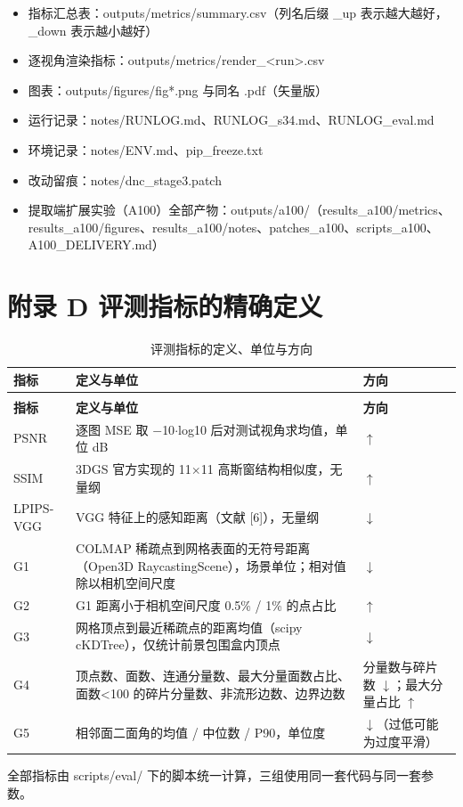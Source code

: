 \documentclass[UTF8,a4paper,11pt]{ctexart}
\begin{document}
\begin{itemize}
\setlength{\itemsep}{2pt}
  \item 指标汇总表：outputs/metrics/summary.csv（列名后缀 \_up 表示越大越好，\_down 表示越小越好）
  \item 逐视角渲染指标：outputs/metrics/render\_<run>.csv
  \item 图表：outputs/figures/fig*.png 与同名 .pdf（矢量版）
  \item 运行记录：notes/RUNLOG.md、RUNLOG\_s34.md、RUNLOG\_eval.md
  \item 环境记录：notes/ENV.md、pip\_freeze.txt
  \item 改动留痕：notes/dnc\_stage3.patch
  \item 提取端扩展实验（A100）全部产物：outputs/a100/（results\_a100/metrics、results\_a100/figures、results\_a100/notes、patches\_a100、scripts\_a100、A100\_DELIVERY.md）
\end{itemize}
\section{附录 D  评测指标的精确定义}
{
\begin{longtable}{>{\raggedright\arraybackslash}p{1.62cm}>{\raggedright\arraybackslash}p{7.21cm}>{\raggedright\arraybackslash}p{5.77cm}}
\caption{评测指标的定义、单位与方向}\label{tab:16}\\
\toprule
\textbf{指标} & \textbf{定义与单位} & \textbf{方向} \\
\midrule
\endfirsthead
\multicolumn{3}{l}{\footnotesize（续表 16）}\\
\toprule
\textbf{指标} & \textbf{定义与单位} & \textbf{方向} \\
\midrule
\endhead
\bottomrule
\endlastfoot
PSNR & 逐图 MSE 取 $-$10$\cdot$log10 后对测试视角求均值，单位 dB & $\uparrow$ \\
SSIM & 3DGS 官方实现的 11$\times$11 高斯窗结构相似度，无量纲 & $\uparrow$ \\
LPIPS-VGG & VGG 特征上的感知距离（文献 [6]），无量纲 & $\downarrow$ \\
G1 & COLMAP 稀疏点到网格表面的无符号距离（Open3D RaycastingScene），场景单位；相对值除以相机空间尺度 & $\downarrow$ \\
G2 & G1 距离小于相机空间尺度 0.5\% / 1\% 的点占比 & $\uparrow$ \\
G3 & 网格顶点到最近稀疏点的距离均值（scipy cKDTree），仅统计前景包围盒内顶点 & $\downarrow$ \\
G4 & 顶点数、面数、连通分量数、最大分量面数占比、面数<100 的碎片分量数、非流形边数、边界边数 & 分量数与碎片数 $\downarrow$；最大分量占比 $\uparrow$ \\
G5 & 相邻面二面角的均值 / 中位数 / P90，单位度 & $\downarrow$（过低可能为过度平滑） \\
\end{longtable}
}
全部指标由 scripts/eval/ 下的脚本统一计算，三组使用同一套代码与同一套参数。
\end{document}
